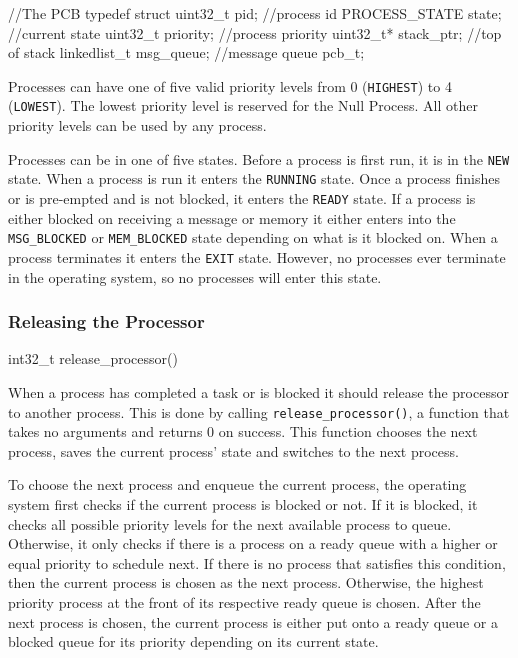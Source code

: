 \documentclass[se]{uw-wkrpt}
\begin{document}
\begin{code}
//The PCB
typedef struct {
    uint32_t pid; //process id
    PROCESS_STATE state; //current state
    uint32_t priority; //process priority
    uint32_t* stack_ptr; //top of stack
    linkedlist_t msg_queue; //message queue
} pcb_t;
\end{code}

Processes can have one of five valid priority levels from 0 (\texttt{HIGHEST}) to 4 (\texttt{LOWEST}). The lowest priority level is reserved for the Null Process. All other priority levels can be used by any process.

Processes can be in one of five states. Before a process is first run, it is in the \texttt{NEW} state. When a process is run it enters the \texttt{RUNNING} state. Once a process finishes or is pre-empted and is not blocked, it enters the \texttt{READY} state. If a process is either blocked on receiving a message or memory it either enters into the \texttt{MSG\_BLOCKED} or \texttt{MEM\_BLOCKED} state depending on what is it blocked on. When a process terminates it enters the \texttt{EXIT} state. However, no processes ever terminate in the operating system, so no processes will enter this state.

\subsubsection{Releasing the Processor}

\begin{code}
int32_t release_processor()
\end{code}

When a process has completed a task or is blocked it should release the processor to another process. This is done by calling \texttt{release\_processor()}, a function that takes no arguments and returns 0 on success. This function chooses the next process, saves the current process' state and switches to the next process.

To choose the next process and enqueue the current process, the operating system first checks if the current process is blocked or not. If it is blocked, it checks all possible priority levels for the next available process to queue. Otherwise, it only checks if there is a process on a ready queue with a higher or equal priority to schedule next. If there is no process that satisfies this condition, then the current process is chosen as the next process. Otherwise, the highest priority process at the front of its respective ready queue is chosen. After the next process is chosen, the current process is either put onto a ready queue or a blocked queue for its priority depending on its current state.
\end{document}
